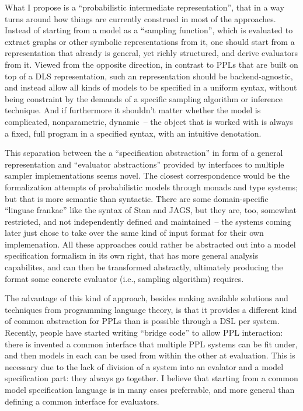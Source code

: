 What I propose is a \enquote{probabilistic intermediate representation}, that in a way turns around
how things are currently construed in most of the approaches.  Instead of starting from a model as a
\enquote{sampling function}, which is evaluated to extract graphs or other symbolic representations
from it, one should start from a representation that already is general, yet richly structured, and
derive evaluators from it.  Viewed from the opposite direction, in contrast to PPLs that are built
on top of a DLS representation, such an representation should be backend-agnostic, and instead allow
all kinds of models to be specified in a uniform syntax, without being constraint by the demands of
a specific sampling algorithm or inference technique.  And if furthermore it shouldn't matter
whether the model is complicated, nonparametric, dynamic~-- the object that is worked with is always
a fixed, full program in a specified syntax, with an intuitive denotation.

This separation between the a \enquote{specification abstraction} in form of a general
representation and \enquote{evaluator abstractions} provided by interfaces to multiple sampler
implementations seems novel.  The closest correspondence would be the formalization attempts of
probabilistic models through monads and type systems; but that is more semantic than syntactic.
There are some domain-specific \enquote{linguae frankae} like the syntax of Stan and JAGS, but they
are, too, somewhat restricted, and not independently defined and maintained~-- the systems coming
later just chose to take over the same kind of input format for their own implemenation.  All these
approaches could rather be abstracted out into a model specification formalism in its own right,
that has more general analysis capabilites, and can then be transformed abstractly, ultimately
producing the format some concrete evaluator (i.e., sampling algorithm) requires.

The advantage of this kind of approach, besides making available solutions and techniques from
programming language theory, is that it provides a different kind of common abstraction for PPLs
than is possible through a DSL per system.  Recently, people have started writing \enquote{bridge
  code} to allow PPL interaction: there is invented a common interface that multiple PPL systems can
be fit under, and then models in each can be used from within the other at evaluation.  This is
necessary due to the lack of division of a system into an evalator and a model specification part:
they always go together.  I believe that starting from a common model specification language is in
many cases preferrable, and more general than defining a common interface for evaluators.

